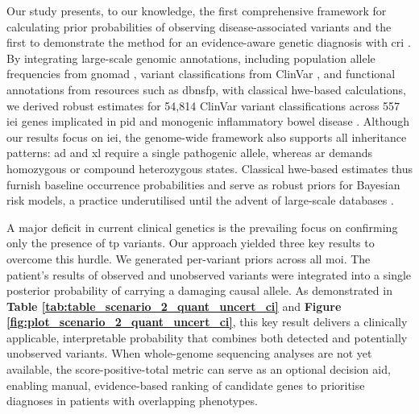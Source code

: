 Our study presents, to our knowledge, the first comprehensive framework for calculating prior probabilities of observing disease-associated variants and the first to demonstrate the method for an evidence-aware genetic diagnosis with \ac{cri} \cite{hannah_using_2024, bick_estimating_2025}.
By integrating large-scale genomic annotations, including population allele frequencies from \ac{gnomad} \cite{karczewski2020mutational}, variant classifications from ClinVar \cite{landrum_clinvar_2018}, and functional annotations from resources such as \ac{dbnsfp}, with classical \ac{hwe}-based calculations, we derived robust estimates for 54,814 ClinVar variant classifications across 557 \ac{iei} genes implicated in \ac{pid} and monogenic inflammatory bowel disease \cite{lawless_panelapprex_2025, poli_human_2025}.
Although our results focus on \ac{iei}, the genome-wide framework also supports all inheritance patterns: \ac{ad} and \ac{xl} require a single pathogenic allele, whereas \ac{ar} demands homozygous or compound heterozygous states. Classical \ac{hwe}-based estimates thus furnish baseline occurrence probabilities and serve as robust priors for Bayesian risk models, a practice underutilised until the advent of large-scale databases \cite{landrum_clinvar_2018, karczewski2020mutational, lawless_panelapprex_2025, cheng_accurate_2023}. 

A major deficit in current clinical genetics is the prevailing focus on confirming only the presence of \ac{tp} variants.
Our approach yielded three key results to overcome this hurdle. 
We generated per-variant priors across all \ac{moi}. 
The patient's results of observed and unobserved variants were integrated into a single posterior probability of carrying a damaging causal allele. 
As demonstrated in 
\textbf{Table \ref{tab:table_scenario_2_quant_uncert_ci}} and
\textbf{Figure \ref{fig:plot_scenario_2_quant_uncert_ci}}, 
this key result delivers a clinically applicable, interpretable probability that combines both detected and potentially unobserved variants.
When whole-genome sequencing analyses are not yet available, the score-positive-total metric can serve as an optional decision aid, enabling manual, evidence-based ranking of candidate genes to prioritise diagnoses in patients with overlapping phenotypes.

